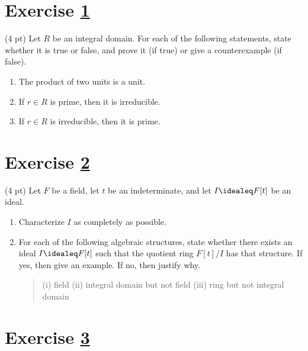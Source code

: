 %
%



\section{Exercise \ref{sec : me01q1}}
\label{sec : me01q1}

(4 pt) Let $R$ be an integral domain. For each of the following statements, state whether it is true or false, and prove it (if true) or give a counterexample (if false).
\begin{enumerate}[label=(\alph*)]
\item\label{itm : me01q1a} The product of two units is a unit.
\item\label{itm : me01q1b} If $r \in R$ is prime, then it is irreducible.
\item\label{itm : me01q1c} If $r \in R$ is irreducible, then it is prime.
\end{enumerate}

\spaceSolution{6in}{%
}%



\section{Exercise \ref{sec : me01q2}}
\label{sec : me01q2}

(4 pt) Let $F$ be a field, let $t$ be an indeterminate, and let $I \idealeq F[t]$ be an ideal.
\begin{enumerate}[label=(\alph*)]
\item\label{itm : me01q2a} Characterize $I$ as completely as possible.
\item\label{itm : me01q2b} For each of the following algebraic structures, state whether there exists an ideal $I \idealeq F[t]$ such that the quotient ring $F[t] / I$ has that structure. If yes, then give an example. If no, then justify why.
\begin{quote}
(i) field
\qquad
(ii) integral domain but not field
\qquad
(iii) ring but not integral domain
\end{quote}
\end{enumerate}

\spaceSolution{6in}{%
}%



\section{Exercise \ref{sec : me01q3}}
\label{sec : me01q3}

